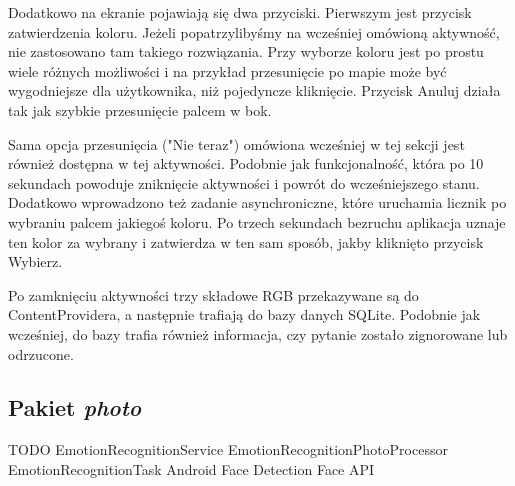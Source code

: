 Dodatkowo na ekranie pojawiają się dwa przyciski. Pierwszym jest przycisk zatwierdzenia koloru. Jeżeli popatrzylibyśmy na wcześniej omówioną aktywność, nie zastosowano tam takiego rozwiązania. Przy wyborze koloru jest po prostu wiele różnych możliwości i na przykład przesunięcie po mapie może być wygodniejsze dla użytkownika, niż pojedyncze kliknięcie. Przycisk Anuluj działa tak jak szybkie przesunięcie palcem w bok.

Sama opcja przesunięcia ("Nie teraz") omówiona wcześniej w tej sekcji jest również dostępna w tej aktywności. Podobnie jak funkcjonalność, która po 10 sekundach powoduje zniknięcie aktywności i powrót do wcześniejszego stanu. Dodatkowo wprowadzono też zadanie asynchroniczne, które uruchamia licznik po wybraniu palcem jakiegoś koloru. Po trzech sekundach bezruchu aplikacja uznaje ten kolor za wybrany i zatwierdza w ten sam sposób, jakby kliknięto przycisk Wybierz.

Po zamknięciu aktywności trzy składowe RGB przekazywane są do ContentProvidera, a następnie trafiają do bazy danych SQLite. Podobnie jak wcześniej, do bazy trafia również informacja, czy pytanie zostało zignorowane lub odrzucone.


\subsection{Pakiet \textit{photo}}

TODO
EmotionRecognitionService
EmotionRecognitionPhotoProcessor
EmotionRecognitionTask
Android Face Detection
Face API



